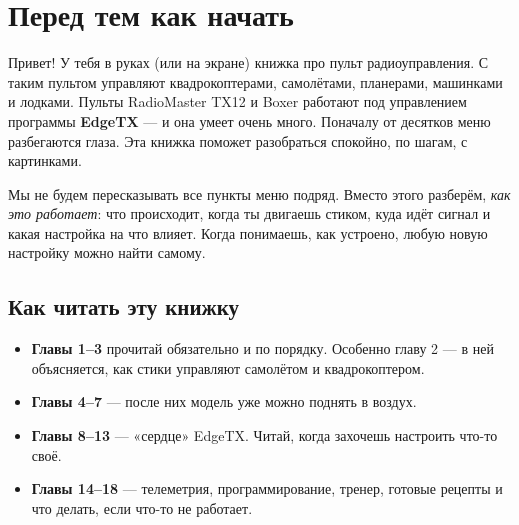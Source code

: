 \chapter*{Перед тем как начать}

Привет! У тебя в руках (или на экране) книжка про пульт радиоуправления. С таким пультом
управляют квадрокоптерами, самолётами, планерами, машинками и лодками. Пульты RadioMaster TX12
и Boxer работают под управлением программы \textbf{EdgeTX} --- и она умеет очень много.
Поначалу от десятков меню разбегаются глаза. Эта книжка поможет разобраться спокойно, по шагам,
с картинками.

Мы не будем пересказывать все пункты меню подряд. Вместо этого разберём, \emph{как это работает}:
что происходит, когда ты двигаешь стиком, куда идёт сигнал и какая настройка на что влияет.
Когда понимаешь, как устроено, любую новую настройку можно найти самому.

\section*{Как читать эту книжку}

\begin{center}
\end{center}

\begin{itemize}
  \item \textbf{Главы 1--3} прочитай обязательно и по порядку. Особенно главу 2 --- в ней
        объясняется, как стики управляют самолётом и квадрокоптером.
  \item \textbf{Главы 4--7} --- после них модель уже можно поднять в воздух.
  \item \textbf{Главы 8--13} --- «сердце» EdgeTX. Читай, когда захочешь настроить что-то своё.
  \item \textbf{Главы 14--18} --- телеметрия, программирование, тренер, готовые рецепты
        и что делать, если что-то не работает.
\end{itemize}

